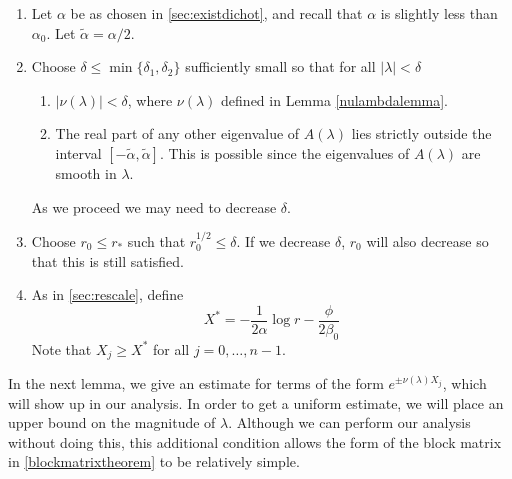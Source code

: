 \documentclass[thesis.tex]{subfiles}
\begin{document}
\begin{enumerate}
	\item Let $\alpha$ be as chosen in \cref{sec:existdichot}, and recall that $\alpha$	is slightly less than $\alpha_0$. Let $\tilde{\alpha} = \alpha/2$.

	\item Choose $\delta \leq \min\{\delta_1, \delta_2\}$ sufficiently small so that for all $|\lambda| < \delta$
	\begin{enumerate}
		\item $|\nu(\lambda)| < \delta$, where $\nu(\lambda)$ defined in Lemma \ref{nulambdalemma}.

		\item The real part of any other eigenvalue of $A(\lambda)$ lies strictly outside the interval $[-\tilde{\alpha}, \tilde{\alpha}]$. This is possible since the eigenvalues of $A(\lambda)$ are smooth in $\lambda$.
	\end{enumerate}
	As we proceed we may need to decrease $\delta$. 

	\item Choose $r_0 \leq r_*$ such that $r_0^{1/2} \leq \delta$. If we decrease $\delta$, $r_0$ will also decrease so that this is still satisfied.

	\item As in \cref{sec:rescale}, define
	\begin{equation}\label{Xstarstab}
	X^* = -\frac{1}{2\alpha}\log r - \frac{\phi}{2\beta_0}
	\end{equation}
	Note that $X_j \geq X^*$ for all $j = 0, \dots, n-1$.

\end{enumerate}

In the next lemma, we give an estimate for terms of the form $e^{\pm \nu(\lambda) X_j}$, which will show up in our analysis. In order to get a uniform estimate, we will place an upper bound on the magnitude of $\lambda$. Although we can perform our analysis without doing this, this additional condition allows the form of the block matrix in \cref{blockmatrixtheorem} to be relatively simple. 
\end{document}

